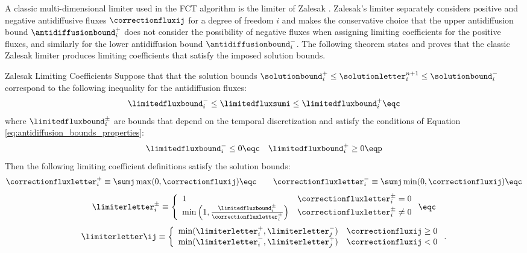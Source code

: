 A classic multi-dimensional limiter used in the FCT algorithm is the
limiter of Zalesak \cite{zalesak}.
Zalesak's limiter separately considers positive and negative antidiffusive
fluxes $\correctionfluxij$ for a degree of freedom $i$ and makes the conservative choice that
the upper antidiffusion bound $\antidiffusionbound_i^+$ does not consider
the possibility of negative fluxes when assigning limiting coefficients
for the positive fluxes, and similarly for the lower antidiffusion bound
$\antidiffusionbound_i^-$.
The following theorem states and proves that the classic Zalesak
limiter produces limiting coefficients that satisfy the imposed solution
bounds.
\begin{theorem}{Zalesak Limiting Coefficients}
   Suppose that that the solution bounds
   $\solutionbound_i^+\le \solutionletter_i^{n+1}\le \solutionbound_i^-$
   correspond to the following inequality for the antidiffusion fluxes:
   \begin{equation}
      \limitedfluxbound_i^- \le \limitedfluxsumi \le \limitedfluxbound_i^+ \eqc
   \end{equation}
   where $\limitedfluxbound_i^\pm$ are bounds that depend on the temporal
   discretization and satisfy the conditions of Equation
   \eqref{eq:antidiffusion_bounds_properties}:
\[
  \limitedfluxbound_i^-\leq 0 \eqc \quad \limitedfluxbound_i^+\geq 0 \eqp
\]
   Then
   the following limiting coefficient definitions satisfy the solution bounds:
   \begin{equation}\label{eq:flux_sums}
      \correctionfluxletter_i^+ \equiv \sumj\max(0,\correctionfluxij) \eqc\qquad
      \correctionfluxletter_i^- \equiv \sumj\min(0,\correctionfluxij) \eqc
   \end{equation}
   \begin{equation}\label{eq:single_node_limiting_coefficients}
      \limiterletter_i^\pm \equiv\left\{
         \begin{array}{l l}
            1 & \correctionfluxletter_i^\pm = 0\\
            \min\left(1,\frac{\limitedfluxbound_i^\pm}
              {\correctionfluxletter_i^\pm}\right) & \correctionfluxletter_i^\pm
              \ne 0
         \end{array}
         \right. \eqc
   \end{equation}
   \begin{equation}\label{eq:limiting_coefficients}
      \limiterletter\ij \equiv\left\{
         \begin{array}{l l}
            \min(\limiterletter_i^+,\limiterletter_j^-)
              & \correctionfluxij \geq 0\\
            \min(\limiterletter_i^-,\limiterletter_j^+)
              & \correctionfluxij < 0
         \end{array}
         \right..
   \end{equation}  
\end{theorem}

